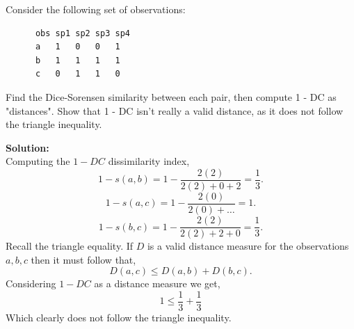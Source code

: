 \documentclass[12pt]{article}
\makeatletter
\theoremstyle{homework}
\newenvironment{exercise}[1]
{\def\@currentlabel{#1}\exercisecore}
{\endexercisecore}
\newcommand{\localhead}[1]{\par\smallskip\noindent\textbf{#1}\nobreak\\}%
\newcommand\solution{\localhead{Solution:}}
\makeatother
\begin{document}
\begin{exercise}{2}
\begin{exercise}{3}
\begin{enumerate}
    \end{enumerate}
  
\end{exercise}

\vspace{1in}




\begin{exercise}{4} Consider the following set of observations:
  \begin{footnotesize}
    \begin{verbatim}
      obs sp1 sp2 sp3 sp4 
      a   1   0   0   1 
      b   1   1   1   1 
      c   0   1   1   0
    \end{verbatim}
    \end{footnotesize} 
  Find the Dice-Sorensen similarity between each pair, then compute 1 -
  DC as "distances".  Show that 1 - DC isn't really a valid distance, as
  it does not follow the triangle inequality.\\
  \solution Computing the $1 - DC$ dissimilarity index, 
  \begin{equation*}
    1 - s(a, b) = 1 - \dfrac{2(2)}{2(2) + 0 + 2} = \dfrac{1}{3}.
  \end{equation*}
  \begin{equation*}
    1 - s(a, c) = 1 - \dfrac{2(0)}{2(0) + \dots} = 1.
  \end{equation*}
  \begin{equation*}
    1 - s(b, c) = 1 - \dfrac{2(2)}{2(2) + 2 + 0} = \dfrac{1}{3}.
  \end{equation*}
  Recall the triangle equality. If $D$ is a valid distance measure for the observations $a, b, c$ then it must follow that, 
  \begin{equation*}
    D(a,c)\leq D(a,b) + D(b,c).
  \end{equation*}
  Considering $1 - DC$ as a distance measure we get, 
  \begin{equation*}
    1 \leq \dfrac{1}{3} + \dfrac{1}{3}
  \end{equation*}
  Which clearly does not follow the triangle inequality. 
  
\end{exercise}      
\vspace{1in}






\end{exercise}
\end{document}
